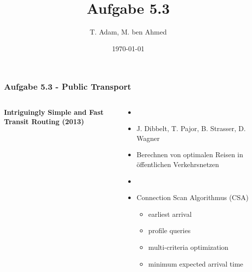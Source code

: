 \documentclass[aspectratio=169]{beamer}
\title[Aufgabe 4.3]{Aufgabe 5.3} %
\author{T. Adam, M. ben Ahmed} %
\institute[UOS] %
{

Universität Osnabrück \\ %

\medskip
\textit{Æ} %


}
\date{\today} %
\begin{document}
\begin{frame}
\titlepage %
\end{frame}





\begin{frame}
	\frametitle{Aufgabe 5.3 - Public Transport}
	\begin{columns}[c] %
		
		\textbf{Intriguingly Simple and Fast Transit Routing (2013)}
		\begin{itemize}
			\item[]
			\item J. Dibbelt, T. Pajor, B. Strasser, D. Wagner
			\item Berechnen von optimalen Reisen in öffentlichen Verkehrsnetzen
			\item[]
			\item Connection Scan Algorithmus (CSA)
			\begin{itemize}
				\item earliest arrival
				\item profile queries
				\item multi-criteria optimization
				\item minimum expected arrival time
			\end{itemize}

		\end{itemize}	
	\end{columns}
	\end{frame}
	
\end{document}
